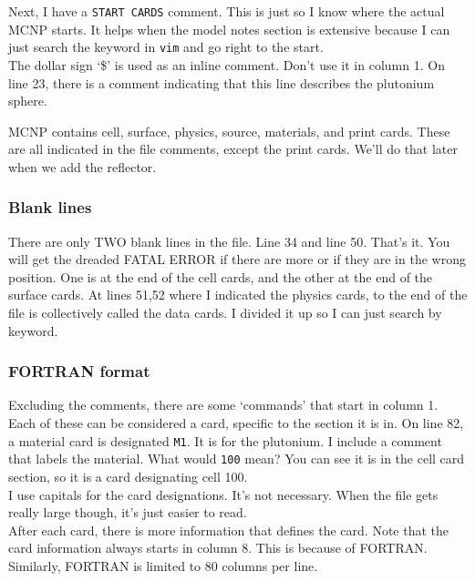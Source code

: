 \documentclass[11pt,a4paper]{article}
\begin{document}
\noindent Next, I have a \texttt{START CARDS} comment. This is just so I know where the actual MCNP starts. It helps when the model notes section is extensive because I can just search the keyword in \texttt{vim} and go right to the start. \\

\noindent The dollar sign `\$' is used as an inline comment. Don't use it in column 1. On line 23, there is a comment indicating that this line describes the plutonium sphere. 

\noindent MCNP contains cell, surface, physics, source, materials, and print cards. These are all indicated in the file comments, except the print cards. We'll do that later when we add the reflector. 

\subsubsection{Blank lines}
\noindent There are only TWO blank lines in the file. Line 34 and line 50. That's it. You will get the dreaded FATAL ERROR if there are more or if they are in the wrong position. One is at the end of the cell cards, and the other at the end of the surface cards. At lines 51,52 where I indicated the physics cards, to the end of the file is collectively called the data cards. I divided it up so I can just search by keyword. \\

\subsubsection{FORTRAN format}
\noindent Excluding the comments, there are some `commands' that start in column 1. Each of these can be considered a card, specific to the section it is in. On line 82, a material card is designated \texttt{M1}. It is for the plutonium. I include a comment that labels the material. What would \texttt{100} mean? You can see it is in the cell card section, so it is a card designating cell 100. \\

\noindent I use capitals for the card designations. It's not necessary. When the file gets really large though, it's just easier to read. \\

\noindent After each card, there is more information that defines the card. Note that the card information always starts in column 8. This is because of FORTRAN. Similarly, FORTRAN is limited to 80 columns per line. 
\end{document}
